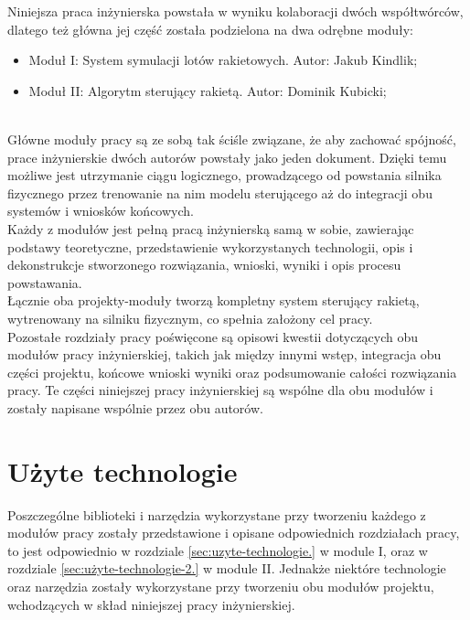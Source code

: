 Niniejsza praca inżynierska powstała w wyniku kolaboracji dwóch
współtwórców, dlatego też główna jej część została podzielona na dwa odrębne
moduły:
\begin{itemize}
    \item Moduł I: System symulacji lotów rakietowych. Autor: Jakub
    Kindlik;
    \item Moduł II: Algorytm sterujący rakietą. Autor: Dominik Kubicki;
\end{itemize}
\\
Główne moduły pracy są ze sobą tak ściśle związane, że aby zachować spójność,
prace inżynierskie dwóch autorów powstały jako jeden
dokument.
Dzięki temu możliwe jest utrzymanie ciągu logicznego, prowadzącego od
powstania silnika fizycznego przez trenowanie na nim modelu sterującego aż
do integracji obu systemów i wniosków końcowych. \\
Każdy z modułów jest pełną pracą inżynierską samą w sobie, zawierając
podstawy teoretyczne, przedstawienie wykorzystanych technologii, opis i
dekonstrukcje stworzonego rozwiązania, wnioski, wyniki i opis procesu
powstawania. \\
Łącznie oba projekty-moduły tworzą kompletny system sterujący rakietą,
wytrenowany na silniku fizycznym, co spełnia założony cel pracy.
\\
Pozostałe rozdziały pracy poświęcone są opisowi kwestii dotyczących obu
modułów pracy inżynierskiej, takich jak między innymi wstęp, integracja obu
części projektu, końcowe wnioski wyniki oraz podsumowanie całości rozwiązania
pracy. Te części niniejszej pracy inżynierskiej są wspólne dla obu modułów i
zostały napisane wspólnie przez obu autorów.

\section{Użyte technologie}
Poszczególne biblioteki i narzędzia wykorzystane przy tworzeniu każdego z
modułów pracy zostały przedstawione i opisane odpowiednich
rozdziałach pracy, to jest odpowiednio w rozdziale
\ref{sec:uzyte-technologie.} w module I, oraz w rozdziale
\ref{sec:użyte-technologie-2.} w module II. Jednakże niektóre technologie
oraz narzędzia zostały wykorzystane przy tworzeniu obu modułów projektu,
wchodzących w skład niniejszej pracy inżynierskiej.

